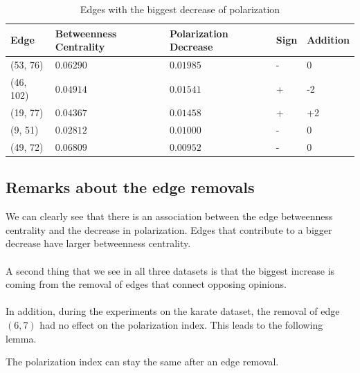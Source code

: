 \begin{table}[H]
 \centering
 \caption{Edges with the biggest decrease of polarization}
 \label{tab:edgesLargest}
 \begin{tabular}{| l || l | l | l | l |}
 \hline
  Edge & Betweenness Centrality & Polarization Decrease & Sign & Addition\\
  \hline
  \hline
  (53, 76) & $0.06290$ & $0.01985$ & - &  0\\
  \hline
  (46, 102) & $0.04914$ & $0.01541$ & + &  -2\\
  \hline
  (19, 77) & $0.04367$ & $0.01458$ & + &  +2\\
  \hline
  (9, 51) & $0.02812$ & $0.01000$ & - &  0\\
  \hline
  (49, 72) & $0.06809$ & $0.00952$ & - &  0\\
  \hline
 \end{tabular} 
\end{table}

\subsection{Remarks about the edge removals}

We can clearly see that there is an association between the edge betweenness centrality and the decrease in polarization. Edges that contribute to a bigger decrease have larger betweenness centrality. 
\\
\\
A second thing that we see in all three datasets is that the biggest increase is coming from the removal of edges that connect opposing opinions.
\\
\\
In addition, during the experiments on the karate dataset, the removal of edge $(6, 7)$ had no effect on the polarization index. This leads to the following lemma.

\begin{lemma}
The polarization index can stay the same after an edge removal.
\end{lemma}

